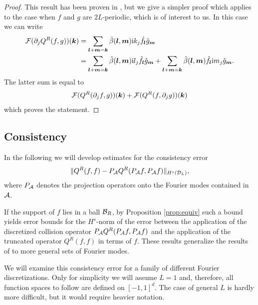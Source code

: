 \begin{proof}
    This result has been proven in \cite{Villani1998fie}, but we give a simpler
    proof which applies to the case when $f$ and $g$ are $2L$-periodic, which
    is of interest to us. In this case we can write
    \begin{align*}
        \mathcal{F}(\partial_j Q^R(f,g))({\bm k})
            &= \sum_{{\bm l}+{\bm m} = {\bm k}}\hat\beta({\bm l},{\bm m})\mathrm{i} k_j\hat f_{\bm l} \hat g_{\bm m}
            \\
            &= \sum_{{\bm l}+{\bm m} = {\bm k}}\hat\beta({\bm l},{\bm m})\mathrm{i} l_j\hat f_{\bm l} \hat g_{\bm m}
            + \sum_{{\bm l}+{\bm m} = {\bm k}}\hat\beta({\bm l},{\bm m})\hat f_{\bm l} \mathrm{i} m_j\hat g_{\bm m}.
    \end{align*}
    The latter sum is equal to
    \[
        \mathcal{F}(Q^R(\partial_jf,g))({\bm k})+
                \mathcal{F}(Q^R(f,\partial_j g))({\bm k})
    \]
    which proves the statement.
\end{proof}

\subsection{Consistency}
In the following we will develop estimates for the consistency error
\[
    \|Q^R(f,f) - {P_{\mathcal{A}}} Q^R({P_{\mathcal{A}}} f,{P_{\mathcal{A}}} f)\|_{H^s(\mathcal{D}_L)},
\]
where ${P_{\mathcal{A}}}$ denotes the projection operators onto the Fourier modes contained
in $\mathcal{A}$.

If the support of $f$ lies in a ball $\mathcal{B}_R$, by Proposition \ref{prop:equiv} such a bound yields error bounds
for the $H^s$-norm of the error between the application of the discretized collision operator ${P_{\mathcal{A}}} Q^R({P_{\mathcal{A}}}
f,{P_{\mathcal{A}}} f)$ and the application of the truncated operator $Q^R(f,f)$ in terms of $f$.  These results generalize
the results of \cite{Pareschi2000nsb} to more general sets of Fourier modes.

We will examine this consistency error for a family of different Fourier
discretizations. Only for simplicity we will assume $L = 1$ and, therefore, all
function spaces to follow are defined on $[-1,1]^d$. The case of general $L$ is
hardly more difficult, but it would require heavier notation.


